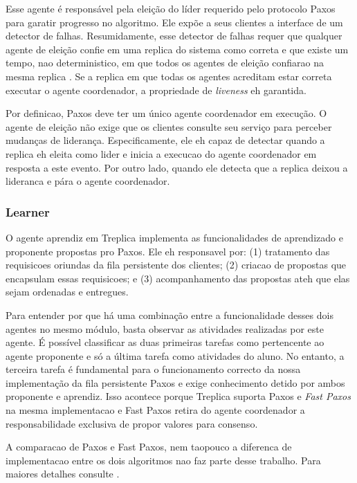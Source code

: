 Esse agente é responsável pela eleição do líder requerido pelo protocolo Paxos para
garatir progresso no algoritmo. Ele expõe a seus clientes a interface de um \Omega
detector de falhas. Resumidamente, esse detector de falhas requer que qualquer agente de
eleição confie em uma replica do sistema como correta e que existe um tempo, nao
deterministico, em que todos os agentes de eleição confiarao na mesma replica
\cite{chandra96}. Se a replica em que todas os agentes acreditam estar correta executar o
agente coordenador, a propriedade de \emph{liveness} eh garantida. 

Por definicao, Paxos deve ter um único agente coordenador em execução. O agente de eleição
não exige que os clientes consulte seu serviço para perceber mudanças de liderança.
Especificamente, ele eh capaz de detectar quando a replica eh eleita como lider e inicia a
execucao do agente coordenador em resposta a este evento. Por outro lado, quando ele
detecta que a replica deixou a lideranca e pára o agente coordenador.

\subsubsection{Learner}

O agente aprendiz em Treplica implementa as funcionalidades de aprendizado e proponente
propostas pro Paxos. Ele eh responsavel por: (1) tratamento das requisicoes oriundas da
fila persistente dos clientes; (2) criacao de propostas que encapsulam essas requisicoes;
e (3) acompanhamento das propostas ateh que elas sejam ordenadas e entregues.

Para entender por que há uma combinação entre a funcionalidade desses dois agentes no
mesmo módulo, basta observar as atividades realizadas por este agente. É possível
classificar as duas primeiras tarefas como pertencente ao agente proponente e só a última
tarefa como atividades do aluno. No entanto, a terceira tarefa é fundamental para
o funcionamento correcto da nossa implementação da fila persistente Paxos e exige
conhecimento detido por ambos proponente e aprendiz. Isso acontece porque Treplica
suporta Paxos e \emph{Fast Paxos} \cite{lamport06a} na mesma implementacao e Fast Paxos
retira do agente coordenador a responsabilidade exclusiva de propor valores para consenso.

A comparacao de Paxos e Fast Paxos, nem taopouco a diferenca de implementacao entre os
dois algoritmos nao faz parte desse trabalho. Para maiores detalhes consulte
.

